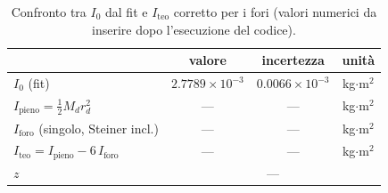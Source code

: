 \documentclass{article}
\begin{document}
{%
\def\arraystretch{1.5}\tabcolsep=10pt
\begin{table}[h!]
    \begin{center}
		\small
        \begin{tabular}{|l|c|c|c|}
            \hline
            & valore & incertezza & unità \\
            \hline
            $I_0$ (fit) & $2.7789 \times 10^{-3}$ & $0.0066 \times 10^{-3}$ & kg$\cdot$m$^2$ \\
            \hline
            $I_\text{pieno} = \frac{1}{2}M_d r_d^2$ & — & — & kg$\cdot$m$^2$ \\
            \hline
            $I_\text{foro}$ (singolo, Steiner incl.) & — & — & kg$\cdot$m$^2$ \\
            \hline
            $I_\text{teo} = I_\text{pieno} - 6\,I_\text{foro}$ & — & — & kg$\cdot$m$^2$ \\
            \hline
            $z$ & \multicolumn{3}{c|}{—} \\
            \hline
        \end{tabular}
    \end{center}
    \caption{Confronto tra $I_0$ dal fit e $I_\text{teo}$ corretto per i fori (valori numerici da inserire dopo l'esecuzione del codice).}
    \label{tabBonus}
\end{table}
}
\end{document}
